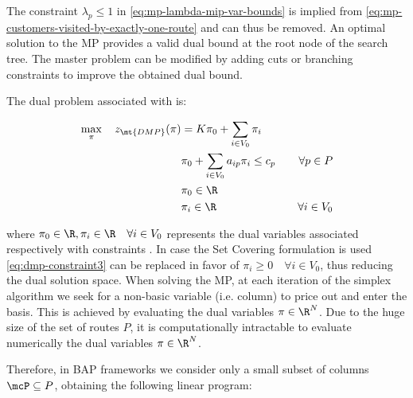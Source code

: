 The constraint $\lambda_p \le 1$ in \cref{eq:mp-lambda-mip-var-bounds} is implied from \cref{eq:mp-customers-visited-by-exactly-one-route} and can thus be removed.
An optimal solution to the MP provides a valid dual bound at the root node of the search tree.
The master problem can be modified by adding cuts or branching constraints to improve the obtained dual bound.

The dual problem associated with 
is:

\begin{align}
	\max_{\pi} \quad z_\mt{DMP}(\pi) & =  K \pi_0 + \sum_{i \in V_0} \pi_i \label{eq:dmp-obj-func}                                                      \\
	                                 & \pi_0 + \sum_{i \in V_0} a_{ip} \pi_i \le c_p               & \quad \forall p \in P \label{eq:dmp-constraint1}   \\
	                                 & \pi_0 \in \R                                                & \label{eq:dmp-constraint2}                         \\
	                                 & \pi_i \in \R                                                & \quad \forall i \in V_0 \label{eq:dmp-constraint3}
\end{align}

where $\pi_0 \in \R, \pi_i \in \R \quad \forall i \in V_0$ represents the dual variables
associated respectively with constraints .
In case the Set Covering formulation is used \cref{eq:dmp-constraint3} can be replaced in favor of $\pi_i \ge 0 \quad \forall i \in V_0$,
thus reducing the dual solution space.
When solving the MP,
at each iteration of the simplex algorithm \parencite{dantzig1955} we seek for a non-basic variable (i.e. column)
to price out and enter the basis.
This is achieved by evaluating the dual variables $\pi \in \R^N$.
Due to the huge size of the set of routes $P$,
it is computationally intractable to evaluate numerically the dual variables $\pi \in \R^{N}$.

\medskip

Therefore, in BAP frameworks we consider only a small subset of columns $\mcP \subseteq P$,
obtaining the following linear program:

